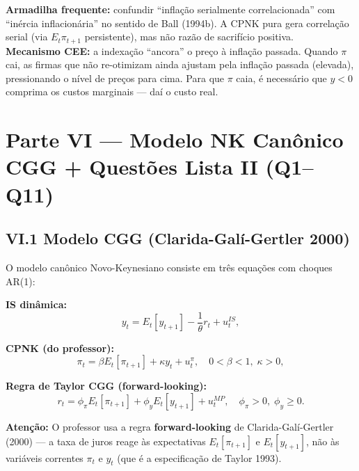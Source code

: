 \documentclass[12pt, a4paper]{article}
\begin{document}
\begin{provabox}[title={Inércia Inflacionária --- Para a Prova}]
\textbf{Armadilha frequente:} confundir ``inflação serialmente correlacionada'' com ``inércia inflacionária'' no sentido de Ball (1994b). A CPNK pura gera correlação serial (via $E_t\pi_{t+1}$ persistente), mas não razão de sacrifício positiva.\\
\textbf{Mecanismo CEE:} a indexação ``ancora'' o preço à inflação passada. Quando $\pi$ cai, as firmas que não re-otimizam ainda ajustam pela inflação passada (elevada), pressionando o nível de preços para cima. Para que $\pi$ caia, é necessário que $y < 0$ comprima os custos marginais --- daí o custo real.
\end{provabox}

\newpage
\section*{\large\color{cyanrbc} Parte VI --- Modelo NK Canônico CGG + Questões Lista II (Q1--Q11)}

\subsection*{VI.1 Modelo CGG (Clarida-Galí-Gertler 2000)}

O modelo canônico Novo-Keynesiano consiste em três equações com choques AR(1):

\textbf{IS dinâmica:}
\begin{equation}
y_t = E_t[y_{t+1}] - \frac{1}{\theta}r_t + u_t^{IS}, \tag{IS}
\end{equation}

\textbf{CPNK (do professor):}
\begin{equation}
\pi_t = \beta E_t[\pi_{t+1}] + \kappa y_t + u_t^\pi, \quad 0<\beta<1,\; \kappa>0, \tag{CPNK}
\end{equation}

\textbf{Regra de Taylor CGG (forward-looking):}
\begin{equation}
\boxed{r_t = \phi_\pi E_t[\pi_{t+1}] + \phi_y E_t[y_{t+1}] + u_t^{MP}, \quad \phi_\pi>0,\; \phi_y\geq 0.} \tag{CGG}
\end{equation}

\textbf{Atenção:} O professor usa a regra \textbf{forward-looking} de Clarida-Galí-Gertler (2000) --- a taxa de juros reage às expectativas $E_t[\pi_{t+1}]$ e $E_t[y_{t+1}]$, não às variáveis correntes $\pi_t$ e $y_t$ (que é a especificação de Taylor 1993).
\end{document}
